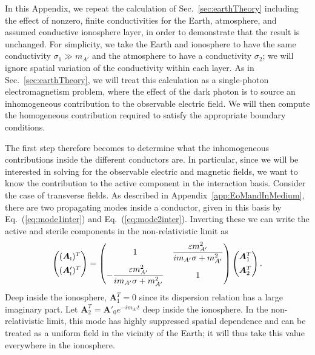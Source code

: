 \documentclass[amsmath,amssymb,aps,10pt,prd,letterpaper,nofootinbib,balancelastpage,notitlepage,superscriptaddress,twocolumn,floatfix]{revtex4-2}
\newcommand{\secref}[2][]{Sec{#1}.~\ref{#2}}		%
\newcommand{\appref}[2][x]{Appendi{#1}~\ref{#2}}	%
\renewcommand{\eqref}[2][]{Eq{#1}.~(\ref{eq:#2})}	%
\newcommand{\inter}[1]{({#1}_{\textsc{i}})}
\newcommand{\primeinter}[1]{({#1}_{\textsc{i}}^\prime)}
\begin{document}
In this Appendix, we repeat the calculation of \secref{sec:earthTheory} including the effect of nonzero, finite conductivities for the Earth, atmosphere, and assumed conductive ionosphere layer, in order to demonstrate that the result is unchanged.
For simplicity, we take the Earth and ionosphere to have the same conductivity $\sigma_1\gg m_{A'}$ and the atmosphere to have a conductivity $\sigma_2$; we will ignore spatial variation of the conductivity within each layer.
As in \secref{sec:earthTheory}, we will treat this calculation as a single-photon electromagnetism problem, where the effect of the dark photon is to source an inhomogeneous contribution to the observable electric field.
We will then compute the homogeneous contribution required to satisfy the appropriate boundary conditions.

The first step therefore becomes to determine what the inhomogeneous contributions inside the different conductors are.
In particular, since we will be interested in solving for the observable electric and magnetic fields, we want to know the contribution to the active component in the interaction basis.
Consider the case of transverse fields.
As described in \appref{app:EoMandInMedium}, there are two propagating modes inside a conductor, given in this basis by \eqref{mode1inter} and \eqref{mode2inter}.
Inverting these we can write the active and sterile components in the non-relativistic limit as
\begin{align}
    \begin{pmatrix}
        \inter{\bm{A}}^T\\[1ex]
        \primeinter{\bm{A}}^T
    \end{pmatrix}
    =
    \begin{pmatrix}
        1   &   \dfrac{\varepsilon m_{A'}^2}{i m_{A'}\sigma+m_{A'}^2}  \\[2ex]
        -\dfrac{\varepsilon m_{A'}^2}{i m_{A'}\sigma+m_{A'}^2}  &1
    \end{pmatrix}
    \begin{pmatrix}
        \bm{A}_1^T\\[1ex]
        \bm{A}_2^T
    \end{pmatrix}.
\end{align}
Deep inside the ionosphere, $\bm{A}_1^T=0$ since its dispersion relation has a large imaginary part.
Let $\bm{A}_2^T=\bm{A}'_0e^{-im_{A'}t}$ deep inside the ionosphere.
In the non-relativistic limit, this mode has highly suppressed spatial dependence and can be treated as a uniform field in the vicinity of the Earth; it will thus take this value everywhere in the ionosphere.
\end{document}
